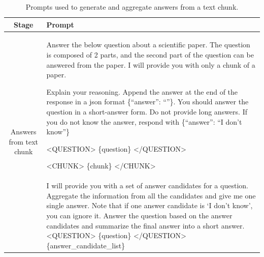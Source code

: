 \begin{table}[!t]
\centering
\small
\renewcommand\tabcolsep{1.0pt} %
\begin{tabular}{cp{11.5cm}}
    \toprule
    \textbf{Stage} & \textbf{Prompt} \\
    \midrule
    \multirow{3}{*}{\parbox{4cm}{\centering Answers from text chunk}}
    &  Answer the below question about a scientific paper. The question is composed of 2 parts, and the second part of the question can be answered from the paper. I will provide you with only a chunk of a paper. 
        
Explain your reasoning. Append the answer at the end of the response in a json format \{``answer'': ``''\}. You should answer the question in a short-answer form. Do not provide long answers. If you do not know the answer, respond with \{``answer'': ``I don't know''\}
        
<QUESTION>
\{question\}
</QUESTION>

<CHUNK>
\{chunk\}
</CHUNK>\\
    \midrule
    \multirow{3}{*}{\parbox{4cm}{\centering Answer aggregation}}
    &  I will provide you with a set of answer candidates for a question. Aggregate the information from all the candidates and give me one single answer. Note that if one answer candidate is `I don't know', you can ignore it.
    Answer the question based on the answer candidates and summarize the final answer into a short answer.
    <QUESTION>
    \{question\}
    </QUESTION>
    \{answer\_candidate\_list\}\\

    \bottomrule
\end{tabular}
\caption{Prompts used to generate and aggregate answers from a text chunk.}
\label{tab:detail prompt}
\end{table}